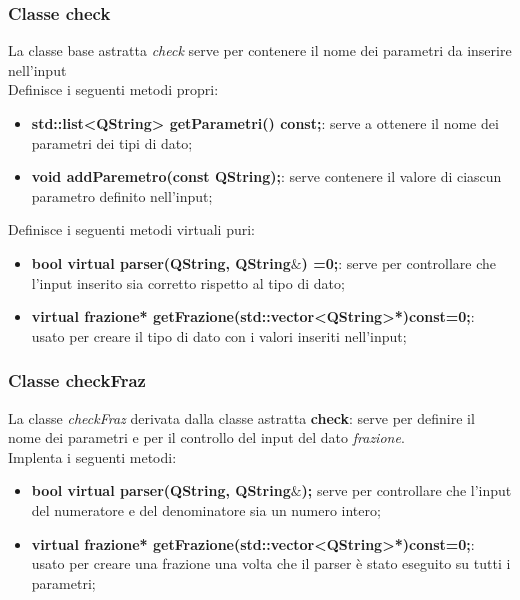 \documentclass[a4paper,10pt]{article}
\begin{document}
    \subsubsection{Classe check}
        La classe base  astratta \textit{check} serve per contenere il nome dei parametri da inserire nell'input
        \\Definisce i seguenti metodi propri:
        \begin{itemize}
            \item \textbf{std::list<QString> getParametri() const;}: serve a ottenere il nome dei parametri dei tipi di dato;
            \item \textbf{void addParemetro(const QString);}: serve contenere il valore di ciascun parametro definito nell'input;
        \end{itemize}
        Definisce i  seguenti metodi virtuali puri:
        \begin{itemize}
            \item \textbf{bool virtual parser(QString, QString$\&$) =0;}: serve per controllare che l'input inserito sia corretto rispetto al tipo di dato;
            \item \textbf{virtual frazione* getFrazione(std::vector<QString>*)const=0;}: usato per creare il tipo di dato con i valori inseriti nell'input; 
        \end{itemize}
    \subsubsection{Classe checkFraz}
        La classe \textit{checkFraz} derivata dalla classe astratta \textbf{check}: serve per definire il nome dei parametri e per il controllo del input del dato \textit{frazione}.
        \\Implenta i seguenti metodi:
        \begin{itemize}
            \item \textbf{bool virtual parser(QString, QString$\&$);} serve per controllare che l'input del numeratore e del denominatore sia un numero intero;
            \item \textbf{virtual frazione* getFrazione(std::vector<QString>*)const=0;}: usato per creare una frazione una volta che il parser è stato eseguito su tutti i parametri; 
        \end{itemize}
\end{document}
